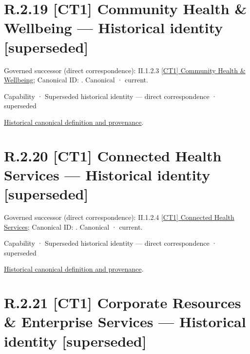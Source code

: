 \section*{R.2.19 [CT1] Community Health \& Wellbeing — Historical identity [superseded]}
\label{navigation:R.2.19}

{\small Governed successor (direct correspondence): II.1.2.3 \hyperref[element:b326b4aaf02a41a986ed22d184cbc152]{[CT1] Community Health \& Wellbeing}; Canonical ID: \texttt{}. Canonical · current.}\par
\label{element:175174c5cce549d2b154a4f6704721dc}
{\small Capability · Superseded historical identity — direct correspondence · superseded}\par
\href{../../../../continuum/strategy/capability/175174c5cce549d2b154a4f6704721dc.md}{Historical canonical definition and provenance}.\par
\section*{R.2.20 [CT1] Connected Health Services — Historical identity [superseded]}
\label{navigation:R.2.20}

{\small Governed successor (direct correspondence): II.1.2.4 \hyperref[element:3ef397463e584737b367e93f0bf1d85d]{[CT1] Connected Health Services}; Canonical ID: \texttt{}. Canonical · current.}\par
\label{element:48f01ef8b0e6431c85cf4f40cf8f94c3}
{\small Capability · Superseded historical identity — direct correspondence · superseded}\par
\href{../../../../continuum/strategy/capability/48f01ef8b0e6431c85cf4f40cf8f94c3.md}{Historical canonical definition and provenance}.\par
\section*{R.2.21 [CT1] Corporate Resources \& Enterprise Services — Historical identity [superseded]}
\label{navigation:R.2.21}

